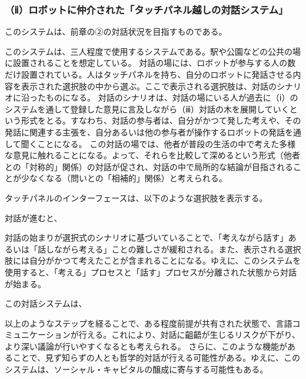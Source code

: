 \documentclass[b5j,twoside,twocolumn]{utarticle}
\begin{document}
\subsubsection*{（ⅱ）ロボットに仲介された「タッチパネル越しの対話システム」}
このシステムは、前章の②の対話状況を目指すものである。


このシステムは、三人程度で使用するシステムである。駅や公園などの公共の場に設置されることを想定している。
対話の場には、ロボットが参与する人の数だけ設置されている。人はタッチパネルを持ち、自分のロボットに発話させる内容を表示された選択肢の中から選ぶ。ここで表示される選択肢は、対話のシナリオに沿ったものになる。
対話のシナリオは、対話の場にいる人が過去に（ⅰ）のシステムを通して登録した意見に言及しながら（ⅲ）対話の木を展開していくという形式をとる。すなわち、対話の参与者は、自分がかつて発した考えや、その発話に関連する主張を、自分あるいは他の参与者が操作するロボットの発話を通して聞くことになる。
この対話の場では、他者が普段の生活の中で考えた多様な意見に触れることになる。よって、それらを比較して深めるという形式（他者との「対称的」関係）の対話が促され、対話の中で局所的な結論が目指されることが少なくなる（問いとの「相補的」関係）と考えられる。


タッチパネルのインターフェースは、以下のような選択肢を表示する。




対話が進むと、



対話の始まりが選択式のシナリオに基づいていることで、「考えながら話す」あるいは「話しながら考える」ことの難しさが緩和される。また、表示される選択肢には自分がかつて考えたことが含まれることになる。ゆえに、このシステムを使用すると、「考える」プロセスと「話す」プロセスが分離された状態から対話が始まる。


この対話システムは、




以上のようなステップを経ることで、ある程度前提が共有された状態で、言語コミュニケーションが行える。これにより、対話に齟齬が生じるリスクが下がり、より深い議論が行いやすくなるとも考えられる。
さらに、このような機能があることで、見ず知らずの人とも哲学的対話が行える可能性がある。ゆえに、このシステムは、ソーシャル・キャピタルの醸成に寄与する可能性もある。
\end{document}
